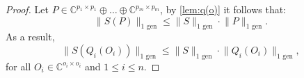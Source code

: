\begin{proof}
  Let $P \in \mathbb{C}^{p_1 \times p_1} \oplus \ldots \oplus  \mathbb{C}^{p_m \times p_m}$, by \autoref{lem:q(o)} it follows that:
  \begin{equation}
    \lVert S(P) \rVert_{1 \text{ gen}} \leq \lVert S  \rVert_{1 \text{ gen}} \cdot \lVert P  \rVert_{1 \text{ gen}}.
  \end{equation}
  As a result, 
  \begin{equation} \label{ineq:gen_trace_submultiplicative_O}
    \lVert S (Q_i (O_i)) \rVert_{1 \text{ gen}} \leq \lVert S  \rVert_{1 \text{ gen}} \cdot \lVert Q_i (O_i)  \rVert_{1 \text{ gen}},
  \end{equation}
  for all $O_i \in \mathbb{C}^{o_i \times o_i}$ and $1 \leq i \leq n$. 
  

\end{proof}
